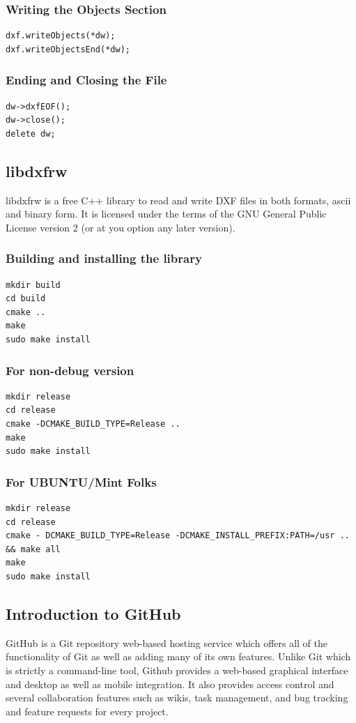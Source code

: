 \subsubsection{Writing the Objects Section}
\begin{verbatim}
dxf.writeObjects(*dw);
dxf.writeObjectsEnd(*dw);
\end{verbatim}
\subsubsection{Ending and Closing the File}
\begin{verbatim}
dw->dxfEOF();
dw->close();
delete dw;
\end{verbatim}

\subsection{libdxfrw}
\noindent libdxfrw is a free C++ library to read and write DXF files in both formats, ascii and binary form. It is licensed under the terms of the GNU General Public License version 2 (or at you option any later version).
\subsubsection*{Building and installing the library}
\begin{verbatim}
mkdir build
cd build
cmake ..
make
sudo make install
\end{verbatim}
\subsubsection*{For non-debug version}
\begin{verbatim}
mkdir release
cd release
cmake -DCMAKE_BUILD_TYPE=Release ..
make
sudo make install
\end{verbatim}
\subsubsection*{For UBUNTU/Mint Folks}
\begin{verbatim}
mkdir release
cd release
cmake - DCMAKE_BUILD_TYPE=Release -DCMAKE_INSTALL_PREFIX:PATH=/usr .. && make all
make
sudo make install
\end{verbatim}



\subsection{Introduction to GitHub}
\noindent GitHub is a Git repository web-based hosting service which offers all of the functionality of Git as well as adding many of its own features. Unlike Git which is strictly a command-line tool, Github provides a web-based graphical interface and desktop as well as mobile integration. It also provides access control and several collaboration features such as wikis, task management, and bug tracking and feature requests for every project.\\

